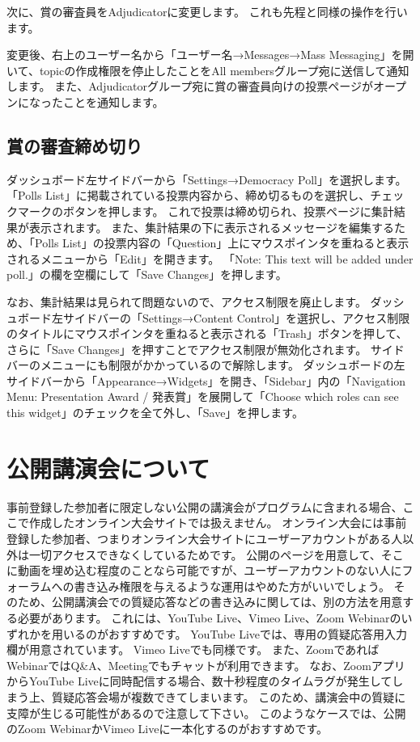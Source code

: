 \documentclass[titlepage,10pt,a4paper,uplatex]{jsbook}
\begin{document}
次に、賞の審査員をAdjudicatorに変更します。
これも先程と同様の操作を行います。

変更後、右上のユーザー名から「ユーザー名→Messages→Mass Messaging」を開いて、topicの作成権限を停止したことをAll membersグループ宛に送信して通知します。
また、Adjudicatorグループ宛に賞の審査員向けの投票ページがオープンになったことを通知します。

\subsection{賞の審査締め切り}

ダッシュボード左サイドバーから「Settings→Democracy Poll」を選択します。
「Polls List」に掲載されている投票内容から、締め切るものを選択し、チェックマークのボタンを押します。
これで投票は締め切られ、投票ページに集計結果が表示されます。
また、集計結果の下に表示されるメッセージを編集するため、「Polls List」の投票内容の「Question」上にマウスポインタを重ねると表示されるメニューから「Edit」を開きます。
「Note: This text will be added under poll.」の欄を空欄にして「Save Changes」を押します。

なお、集計結果は見られて問題ないので、アクセス制限を廃止します。
ダッシュボード左サイドバーの「Settings→Content Control」を選択し、アクセス制限のタイトルにマウスポインタを重ねると表示される「Trash」ボタンを押して、さらに「Save Changes」を押すことでアクセス制限が無効化されます。
サイドバーのメニューにも制限がかかっているので解除します。
ダッシュボードの左サイドバーから「Appearance→Widgets」を開き、「Sidebar」内の「Navigation Menu: Presentation Award / 発表賞」を展開して「Choose which roles can see this widget」のチェックを全て外し、「Save」を押します。

\section{公開講演会について}

事前登録した参加者に限定しない公開の講演会がプログラムに含まれる場合、ここで作成したオンライン大会サイトでは扱えません。
オンライン大会には事前登録した参加者、つまりオンライン大会サイトにユーザーアカウントがある人以外は一切アクセスできなくしているためです。
公開のページを用意して、そこに動画を埋め込む程度のことなら可能ですが、ユーザーアカウントのない人にフォーラムへの書き込み権限を与えるような運用はやめた方がいいでしょう。
そのため、公開講演会での質疑応答などの書き込みに関しては、別の方法を用意する必要があります。
これには、YouTube Live、Vimeo Live、Zoom Webinarのいずれかを用いるのがおすすめです。
YouTube Liveでは、専用の質疑応答用入力欄が用意されています。
Vimeo Liveでも同様です。
また、ZoomであればWebinarではQ\&A、Meetingでもチャットが利用できます。
なお、ZoomアプリからYouTube Liveに同時配信する場合、数十秒程度のタイムラグが発生してしまう上、質疑応答会場が複数できてしまいます。
このため、講演会中の質疑に支障が生じる可能性があるので注意して下さい。
このようなケースでは、公開のZoom WebinarかVimeo Liveに一本化するのがおすすめです。
\end{document}

